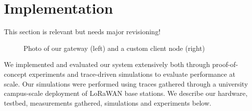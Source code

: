 \section{Implementation}
\label{sec:arch}

{\color{red} This section is relevant but needs major revisioning!}



\begin{figure}%
\centering
\compactimg
{}
\hfill
{}
\caption{Photo of our gateway (left) and a custom client node (right)}
\end{figure}



We implemented and evaluated our system extensively both through proof-of-concept experiments and trace-driven simulations to evaluate performance at scale. Our simulations were performed using traces gathered through a university campus-scale deployment of LoRaWAN base stations. We describe our hardware, testbed, measurements gathered, simulations and experiments below. 


